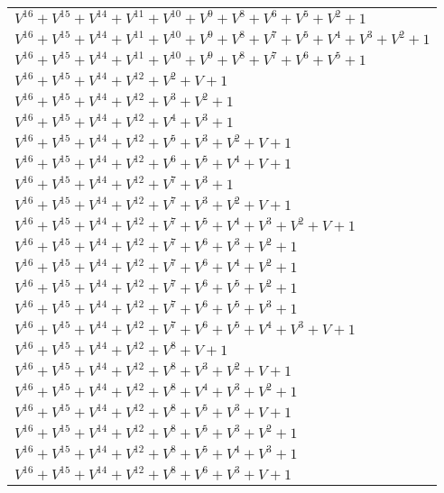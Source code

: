 \documentclass[12pt]{article}
\begin{document}
\begin{adjustwidth}{-4cm}{}
\begin{center}
\begin{longtable}{|l|}
$V^{16}  +V^{15}  +V^{14}  +V^{11}  +V^{10}  +V^{9}  +V^{8}  +V^{6}  +V^{5}  +V^{2}  + 1$ \\
$V^{16}  +V^{15}  +V^{14}  +V^{11}  +V^{10}  +V^{9}  +V^{8}  +V^{7}  +V^{5}  +V^{4}  +V^{3}  +V^{2}  + 1$ \\
$V^{16}  +V^{15}  +V^{14}  +V^{11}  +V^{10}  +V^{9}  +V^{8}  +V^{7}  +V^{6}  +V^{5}  + 1$ \\
$V^{16}  +V^{15}  +V^{14}  +V^{12}  +V^{2}  + V + 1$ \\
$V^{16}  +V^{15}  +V^{14}  +V^{12}  +V^{3}  +V^{2}  + 1$ \\
$V^{16}  +V^{15}  +V^{14}  +V^{12}  +V^{4}  +V^{3}  + 1$ \\
$V^{16}  +V^{15}  +V^{14}  +V^{12}  +V^{5}  +V^{3}  +V^{2}  + V + 1$ \\
$V^{16}  +V^{15}  +V^{14}  +V^{12}  +V^{6}  +V^{5}  +V^{4}  + V + 1$ \\
$V^{16}  +V^{15}  +V^{14}  +V^{12}  +V^{7}  +V^{3}  + 1$ \\
$V^{16}  +V^{15}  +V^{14}  +V^{12}  +V^{7}  +V^{3}  +V^{2}  + V + 1$ \\
$V^{16}  +V^{15}  +V^{14}  +V^{12}  +V^{7}  +V^{5}  +V^{4}  +V^{3}  +V^{2}  + V + 1$ \\
$V^{16}  +V^{15}  +V^{14}  +V^{12}  +V^{7}  +V^{6}  +V^{3}  +V^{2}  + 1$ \\
$V^{16}  +V^{15}  +V^{14}  +V^{12}  +V^{7}  +V^{6}  +V^{4}  +V^{2}  + 1$ \\
$V^{16}  +V^{15}  +V^{14}  +V^{12}  +V^{7}  +V^{6}  +V^{5}  +V^{2}  + 1$ \\
$V^{16}  +V^{15}  +V^{14}  +V^{12}  +V^{7}  +V^{6}  +V^{5}  +V^{3}  + 1$ \\
$V^{16}  +V^{15}  +V^{14}  +V^{12}  +V^{7}  +V^{6}  +V^{5}  +V^{4}  +V^{3}  + V + 1$ \\
$V^{16}  +V^{15}  +V^{14}  +V^{12}  +V^{8}  + V + 1$ \\
$V^{16}  +V^{15}  +V^{14}  +V^{12}  +V^{8}  +V^{3}  +V^{2}  + V + 1$ \\
$V^{16}  +V^{15}  +V^{14}  +V^{12}  +V^{8}  +V^{4}  +V^{3}  +V^{2}  + 1$ \\
$V^{16}  +V^{15}  +V^{14}  +V^{12}  +V^{8}  +V^{5}  +V^{3}  + V + 1$ \\
$V^{16}  +V^{15}  +V^{14}  +V^{12}  +V^{8}  +V^{5}  +V^{3}  +V^{2}  + 1$ \\
$V^{16}  +V^{15}  +V^{14}  +V^{12}  +V^{8}  +V^{5}  +V^{4}  +V^{3}  + 1$ \\
$V^{16}  +V^{15}  +V^{14}  +V^{12}  +V^{8}  +V^{6}  +V^{3}  + V + 1$ \\

\end{longtable}
\end{center}
\end{adjustwidth}
\end{document}
